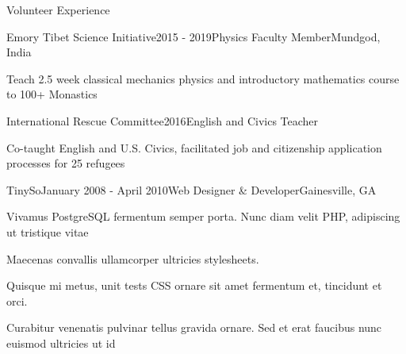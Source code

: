 \documentclass{resume} %
\begin{document}
\begin{rSection}{Volunteer Experience}

\begin{rSubsection}{Emory Tibet Science Initiative}{2015 - 2019}{Physics Faculty Member}{Mundgod, India}
\item Teach 2.5 week classical mechanics physics and introductory mathematics course to 100+ Monastics

\end{rSubsection}


\begin{rSubsection}{International Rescue Committee}{2016}{English and Civics Teacher}{}
\item Co-taught English and U.S. Civics, facilitated job and citizenship application processes for 25 refugees

\end{rSubsection}


\begin{rSubsection}{TinySo}{January 2008 - April 2010}{Web Designer \& Developer}{Gainesville, GA}
\item Vivamus PostgreSQL fermentum semper porta. Nunc diam velit PHP, adipiscing ut tristique vitae
\item Maecenas convallis ullamcorper ultricies stylesheets.
\item Quisque mi metus, unit tests CSS ornare sit amet fermentum et, tincidunt et orci.
\item Curabitur venenatis pulvinar tellus gravida ornare. Sed et erat faucibus nunc euismod ultricies ut id
\end{rSubsection}

\end{rSection}

\end{document}
